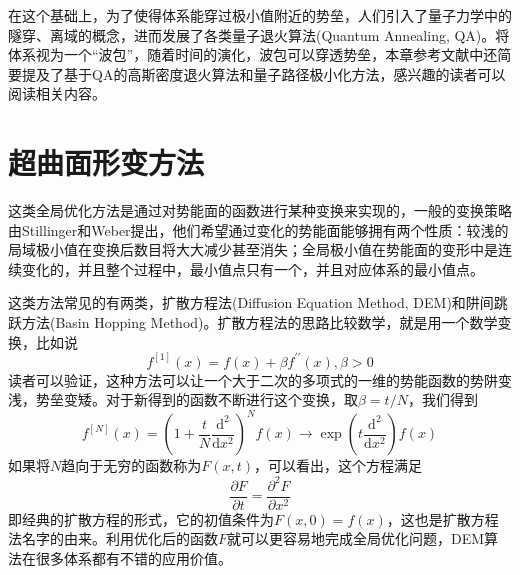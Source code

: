 \documentclass[12pt,a4paper,openany,twoside]{book}
\numberwithin{equation}{section}
\newcommand{\ud}{\mathrm{d}}
\begin{document}
        在这个基础上，为了使得体系能穿过极小值附近的势垒，人们引入了量子力学中的隧穿、离域的概念，进而发展了各类量子退火算法(Quantum Annealing, QA)。将体系视为一个“波包”，随着时间的演化，波包可以穿透势垒，本章参考文献中还简要提及了基于QA的高斯密度退火算法和量子路径极小化方法，感兴趣的读者可以阅读相关内容。
      \section{超曲面形变方法}
        这类全局优化方法是通过对势能面的函数进行某种变换来实现的，一般的变换策略由Stillinger和Weber提出，他们希望通过变化的势能面能够拥有两个性质：较浅的局域极小值在变换后数目将大大减少甚至消失；全局极小值在势能面的变形中是连续变化的，并且整个过程中，最小值点只有一个，并且对应体系的最小值点。

        这类方法常见的有两类，扩散方程法(Diffusion Equation Method, DEM)和阱间跳跃方法(Basin Hopping Method)。扩散方程法的思路比较数学，就是用一个数学变换，比如说
        \begin{equation*}
          f^{[1]}(x) = f(x) + \beta f^{\prime \prime}(x), \beta>0
        \end{equation*}
        读者可以验证，这种方法可以让一个大于二次的多项式的一维的势能函数的势阱变浅，势垒变矮。对于新得到的函数不断进行这个变换，取$\beta = t/N$，我们得到
        \begin{equation*}
          f^{[N]}(x) = \left(1+\frac{t}{N}\frac{\ud^2}{\ud x^2}\right)^N f(x)\rightarrow \exp\left(t\frac{\ud^2}{\ud x^2}\right)f(x)
        \end{equation*}
        如果将$N$趋向于无穷的函数称为$F(x,t)$，可以看出，这个方程满足
        \begin{equation*}
          \frac{\partial F}{\partial t} = \frac{\partial^2 F}{\partial x^2}
        \end{equation*}
        即经典的扩散方程的形式，它的初值条件为$F(x,0)=f(x)$，这也是扩散方程法名字的由来。利用优化后的函数$F$就可以更容易地完成全局优化问题，DEM算法在很多体系都有不错的应用价值。
\end{document}
